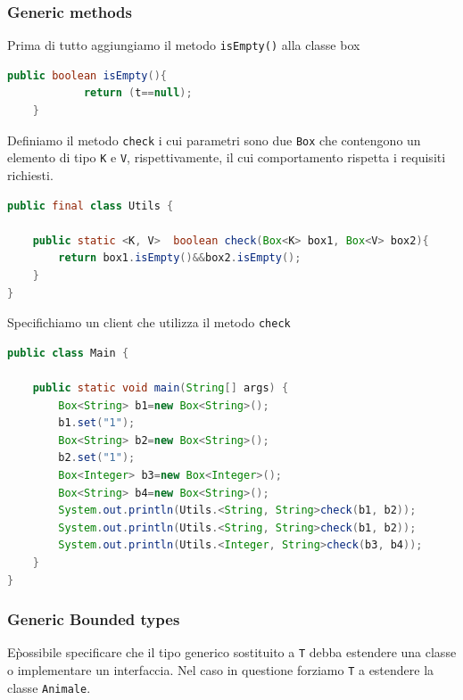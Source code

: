 \documentclass{article}
\begin{document}
\subsubsection{Generic methods}

Prima di tutto aggiungiamo il metodo \texttt{isEmpty()} alla classe box
\begin{lstlisting}[language=Java]
public boolean isEmpty(){
    		return (t==null);
    }
\end{lstlisting}

Definiamo il metodo \texttt{check} i cui parametri sono due \texttt{Box} che contengono un elemento di tipo \texttt{K} e \texttt{V}, rispettivamente, il cui comportamento rispetta i requisiti richiesti.
\begin{lstlisting}[language=Java]
public final class Utils {

	public static <K, V>  boolean check(Box<K> box1, Box<V> box2){
		return box1.isEmpty()&&box2.isEmpty();
	}
}
\end{lstlisting}
Specifichiamo un client che utilizza il metodo \texttt{check}
\begin{lstlisting}[language=Java]
public class Main {

	public static void main(String[] args) {
		Box<String> b1=new Box<String>();
		b1.set("1");
		Box<String> b2=new Box<String>();
		b2.set("1");
		Box<Integer> b3=new Box<Integer>();
		Box<String> b4=new Box<String>();
		System.out.println(Utils.<String, String>check(b1, b2));
		System.out.println(Utils.<String, String>check(b1, b2));
		System.out.println(Utils.<Integer, String>check(b3, b4));
	}
}
\end{lstlisting}

\subsubsection{Generic Bounded types}

E\` possibile specificare che il tipo generico sostituito a \texttt{T} debba estendere una classe o implementare un interfaccia. Nel caso in questione forziamo \texttt{T} a estendere la classe \texttt{Animale}.
\end{document}
